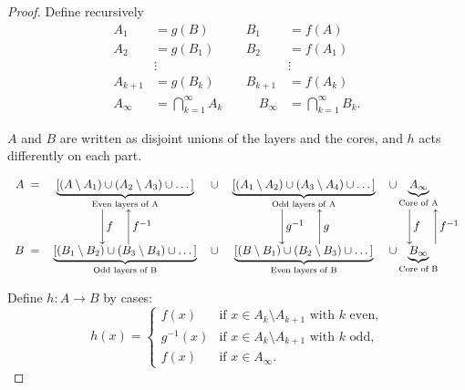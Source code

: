 \documentclass[11pt, a4paper]{article}
\begin{document}
\begin{proof}
Define recursively
\begin{align*}
    A_1 &= g(B) & B_1 &= f(A) \\
    A_2 &= g(B_1) & B_2 &= f(A_1) \\
    &\vdots & &\vdots \\
    A_{k+1} &= g(B_k) & B_{k+1} &= f(A_k) \\
    A_\infty &= \bigcap_{k=1}^{\infty} A_k \quad & \quad B_\infty &= \bigcap_{k=1}^{\infty} B_k.
\end{align*}

$A$ and $B$ are written as disjoint unions of the layers and the cores, and $h$ acts
differently on each part.

\[
\setlength{\arraycolsep}{6pt}
\begin{array}{rcccl}
    A \; = &
    \underbrace{\left[ (A \setminus A_1) \cup (A_2 \setminus A_3) \cup \dots \right]}_{\text{Even
    layers of A}} &
    \cup &
    \underbrace{\left[ (A_1 \setminus A_2) \cup (A_3 \setminus A_4) \cup \dots \right]}_{\text{Odd
    layers of A}} &
    \cup \underbrace{A_\infty}_{\text{Core of A}} \\

    &
    \Bigg\downarrow f \quad \Bigg\uparrow f^{-1} &
    &
    \Bigg\downarrow g^{-1} \quad \Bigg\uparrow g &

    \hspace{0.5cm} \Bigg\downarrow f \quad \Bigg\uparrow f^{-1} \\

    B \; = &
    \underbrace{\left[ (B_1 \setminus B_2) \cup (B_3 \setminus B_4) \cup \dots \right]}_{\text{Odd
    layers of B}} &
    \cup &
    \underbrace{\left[ (B \setminus B_1) \cup (B_2 \setminus B_3) \cup \dots \right]}_{\text{Even
    layers of B}} &
    \cup \underbrace{B_\infty}_{\text{Core of B}} \\
\end{array}
\]

Define $h: A \to B$ by cases:
$$
h(x) = \begin{cases}
    f(x) & \text{if } x \in A_k \setminus A_{k+1} \text{ with } k \text{ even,} \\
    g^{-1}(x) & \text{if } x \in A_k \setminus A_{k+1} \text{ with } k \text{ odd,} \\
    f(x) & \text{if } x \in A_\infty.
\end{cases}
$$


\end{proof}
\end{document}
